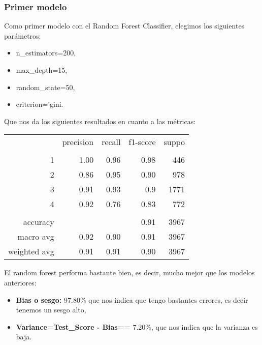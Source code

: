 \documentclass[a4paper]{article}
\begin{document}
        \subsubsection{Primer modelo}

            Como primer modelo con el Random Forest Classifier, elegimos los siguientes parámetros:
            \begin{itemize}
                \item n\_estimators=200,
                \item max\_depth=15,
                \item random\_state=50,
                \item criterion='gini.
            \end{itemize}

            Que nos da los siguientes resultados en cuanto a las métricas:
            \begin{table}[H]
                \centering
                \begin{tabular}{rrrrr}
                    ~ & precision & recall & f1-score & suppo \\
                    & & & & \\
                    1 & 1.00 & 0.96 & 0.98 & 446 \\
                    2 & 0.86 & 0.95 & 0.90 & 978 \\
                    3 & 0.91 & 0.93 & 0.9 & 1771 \\
                    4 & 0.92 & 0.76 & 0.83 & 772 \\
                    & & & & \\
                    accuracy & & & 0.91 & 3967 \\
                    macro avg & 0.92 & 0.90 & 0.91 & 3967 \\
                    weighted avg & 0.91 & 0.91 & 0.90 & 3967 \\
                \end{tabular}
            \end{table}

             El random forest performa bastante bien, es decir, mucho mejor que los modelos anteriores:
             \begin{itemize}
                \item \textbf{Bias o sesgo:} 97.80\% que nos indica que tengo bastantes errores, es decir tenemos un sesgo alto,
                \item \textbf{Variance=Test\_Score - Bias==} 7.20\%, que nos indica que la varianza es baja.
             \end{itemize}
\end{document}
